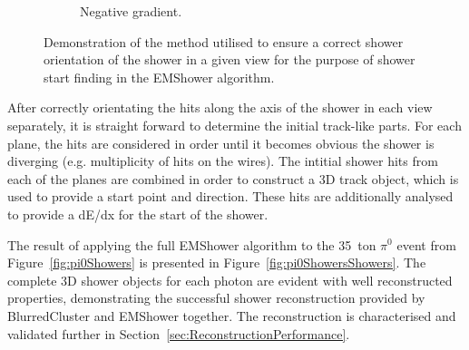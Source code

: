 \begin{figure}
\begin{subfigure}[t]{0.48\linewidth}
    \caption{Negative gradient.}
    \label{fig:EMShowerOrientationNegative}
  \end{subfigure}
  \caption[Demonstration of the method utilised to ensure a correct shower orientation of the shower in a given view for the purpose of shower start finding in the EMShower algorithm.]{Demonstration of the method utilised to ensure a correct shower orientation of the shower in a given view for the purpose of shower start finding in the EMShower algorithm.}
  \label{fig:EMShowerOrientation}
\end{figure}

After correctly orientating the hits along the axis of the shower in each view separately, it is straight forward to determine the initial track-like parts.  For each plane, the hits are considered in order until it becomes obvious the shower is diverging (e.g. multiplicity of hits on the wires).  The intitial shower hits from each of the planes are combined in order to construct a 3D track object, which is used to provide a start point and direction.  These hits are additionally analysed to provide a dE/dx for the start of the shower.

The result of applying the full EMShower algorithm to the 35~ton $\pi^0$ event from Figure~\ref{fig:pi0Showers} is presented in Figure~\ref{fig:pi0ShowersShowers}.  The complete 3D shower objects for each photon are evident with well reconstructed properties, demonstrating the successful shower reconstruction provided by BlurredCluster and EMShower together.  The reconstruction is characterised and validated further in Section~\ref{sec:ReconstructionPerformance}.

